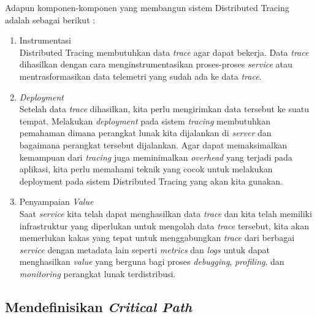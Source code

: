 Adapun komponen-komponen yang membangun sistem Distributed Tracing adalah sebagai berikut \citep{parker2020distributed}:
\begin{enumerate}
      \item Instrumentasi \\
            Distributed Tracing membutuhkan data \textit{trace} agar dapat bekerja.
            Data \textit{trace} dihasilkan dengan cara menginstrumentasikan proses-proses \textit{service} atau mentrasformasikan data telemetri yang sudah ada ke data \textit{trace}.
      \item \textit{Deployment} \\
            Setelah data \textit{trace} dihasilkan, kita perlu mengirimkan data tersebut ke suatu tempat.
            Melakukan \textit{deployment} pada sistem \textit{tracing} membutuhkan pemahaman dimana perangkat lunak kita dijalankan di \textit{server} dan bagaimana perangkat tersebut dijalankan.
            Agar dapat memaksimalkan kemampuan dari \textit{tracing} juga meminimalkan \textit{overhead} yang terjadi pada aplikasi, kita perlu memahami teknik yang cocok untuk melakukan deployment pada sistem Distributed Tracing yang akan kita gunakan.
      \item Penyampaian \textit{Value} \\
            Saat \textit{service} kita telah dapat menghasilkan data \textit{trace} dan kita telah memiliki infrastruktur yang diperlukan untuk mengolah data \textit{trace} tersebut, kita akan memerlukan kakas yang tepat untuk menggabungkan \textit{trace} dari berbagai \textit{service} dengan metadata lain seperti \textit{metrics} dan \textit{logs} untuk dapat menghasilkan \textit{value} yang berguna bagi proses \textit{debugging}, \textit{profiling}, dan \textit{monitoring} perangkat lunak terdistribusi.
\end{enumerate}


\subsection{Mendefinisikan \textit{Critical Path}}
\label{ch2-crit-path}


